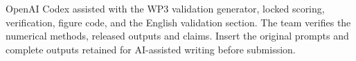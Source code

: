 OpenAI Codex assisted with the WP3 validation generator, locked scoring, verification, figure code, and the English validation section. The team verifies the numerical methods, released outputs and claims. Insert the original prompts and complete outputs retained for AI-assisted writing before submission.
